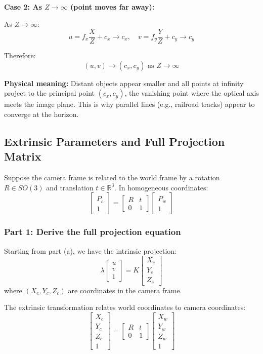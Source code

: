 \documentclass[11pt]{article}
\begin{document}
\textbf{Case 2: As $Z \to \infty$ (point moves far away):}

As $Z \to \infty$:
\[
u = f_x \frac{X}{Z} + c_x \to c_x, \quad v = f_y \frac{Y}{Z} + c_y \to c_y
\]

Therefore:
\[
\boxed{(u, v) \to (c_x, c_y) \text{ as } Z \to \infty}
\]

\textbf{Physical meaning:} Distant objects appear smaller and all points at infinity project to the principal point $(c_x, c_y)$, the vanishing point where the optical axis meets the image plane. This is why parallel lines (e.g., railroad tracks) appear to converge at the horizon.

\subsection{Extrinsic Parameters and Full Projection Matrix}

Suppose the camera frame is related to the world frame by a rotation $R \in SO(3)$ and translation $t \in \mathbb{R}^3$. In homogeneous coordinates:
\[
\begin{bmatrix} P_c \\ 1 \end{bmatrix} = \begin{bmatrix} R & t \\ 0 & 1 \end{bmatrix} \begin{bmatrix} P_w \\ 1 \end{bmatrix}
\]

\subsubsection*{Part 1: Derive the full projection equation}

Starting from part (a), we have the intrinsic projection:
\[
\lambda \begin{bmatrix} u \\ v \\ 1 \end{bmatrix} = K \begin{bmatrix} X_c \\ Y_c \\ Z_c \end{bmatrix}
\]
where $(X_c, Y_c, Z_c)$ are coordinates in the camera frame.

The extrinsic transformation relates world coordinates to camera coordinates:
\[
\begin{bmatrix} X_c \\ Y_c \\ Z_c \\ 1 \end{bmatrix} = \begin{bmatrix} R & t \\ 0 & 1 \end{bmatrix} \begin{bmatrix} X_w \\ Y_w \\ Z_w \\ 1 \end{bmatrix}
\]
\end{document}
